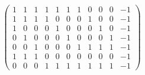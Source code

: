 \[
 \left(\begin{array}{rrrrrrrrrrr}
1 & 1 & 1 & 1 & 1 & 1 & 1 & 0 & 0 & 0 & -1 \\
1 & 1 & 1 & 1 & 0 & 0 & 0 & 1 & 0 & 0 & -1 \\
1 & 0 & 0 & 0 & 1 & 0 & 0 & 0 & 1 & 0 & -1 \\
0 & 1 & 0 & 0 & 0 & 1 & 0 & 0 & 0 & 1 & -1 \\
0 & 0 & 1 & 0 & 0 & 0 & 1 & 1 & 1 & 1 & -1 \\
1 & 1 & 1 & 0 & 0 & 0 & 0 & 0 & 0 & 0 & -1 \\
0 & 0 & 0 & 1 & 1 & 1 & 1 & 1 & 1 & 1 & -1
\end{array}\right) 
\]
